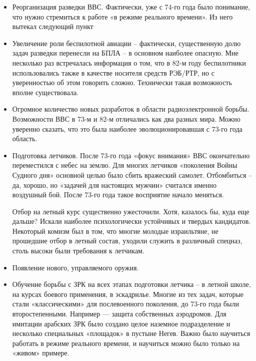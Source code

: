\begin{itemize}
	\item Реорганизация разведки ВВС. Фактически, уже с 74-го года было понимание, что нужно стремиться к работе «в режиме реального времени». Из него вытекал следующий пункт

\item Увеличение роли беспилотной авиации – фактически, существенную долю задач разведки перенесли на БПЛА – в основном наиболее опасную. Мне несколько раз встречалась информация о том, что в 82-м году беспилотники использовались также в качестве носителя средств РЭБ/РТР, но с уверенностью об этом говорить сложно. Технически такая возможность вполне существовала.

\item Огромное количество новых разработок в области радиоэлектронной борьбы. Возможности ВВС в 73-м и 82-м отличались как два разных мира. Можно уверенно сказать, что это была наиболее эволюционировавшая с 73-го года область.

\item Подготовка летчиков. После 73-го года «фокус внимания» ВВС окончательно переместился с небес на землю. Для многих летчиков «поколения Войны Судного дня» основной целью было сбить вражеский самолет. Отбомбиться – да, хорошо, но «задачей для настоящих мужчин» считался именно воздушный бой. После 73-го года такое восприятие начало меняться.

Отбор на летный курс существенно ужесточили. Хотя, казалось бы, куда еще дальше? Искали наиболее психологически устойчивых и твердых кандидатов. Некоторый комизм был в том, что многие молодые израильтяне, не прошедшие отбор в летный состав, уходили служить в различный спецназ, столь высоки были требования к летчикам.

\item Появление нового, управляемого оружия.

\item Обучение борьбы с ЗРК на всех этапах подготовки летчика – в летной школе, на курсах боевого применения, в эскадрилье. Многие из тех задач, которые стали «классическими» для послевоенного поколения, до 73-го года были второстепенными. Например — защита собственных аэродромов.
Для имитации арабских ЗРК было создано целое наземное подразделение и несколько специальных «площадок» в пустыне Негев. Важно было научиться работать в режиме реального времени, и научиться можно было только на «живом» примере. 
\end{itemize}

